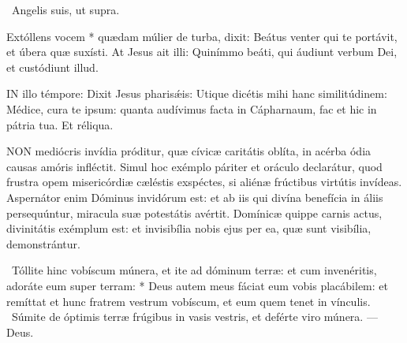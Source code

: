 \V\ Angelis suis, ut supra.

 Extóllens vocem * quædam múlier de turba, dixit: Beátus venter qui te portávit, et úbera quæ suxísti. At Jesus ait illi: Quinímmo beáti, qui áudiunt verbum Dei, et custódiunt illud.

\sectionornament





\lettrine[lines=2]{I}{N} illo témpore: Dixit Jesus pharisǽis: Utique dicétis mihi hanc similitúdinem: Médice, cura te ipsum: quanta audívimus facta in Cápharnaum, fac et hic in pátria tua. Et réliqua.



\lettrine[lines=2]{N}{ON} mediócris invídia próditur, quæ cívicæ caritátis oblíta, in acérba ódia causas amóris infléctit. Simul hoc exémplo páriter et oráculo declarátur, quod frustra opem misericórdiæ cæléstis exspéctes, si aliénæ frúctibus virtútis invídeas. Aspernátor enim Dóminus invidórum est: et ab iis qui divína benefícia in áliis persequúntur, miracula suæ potestátis avértit. Domínicæ quippe carnis actus, divinitátis exémplum est: et invisibília nobis ejus per ea, quæ sunt visibília, demonstrántur.

\R\ Tóllite hinc vobíscum múnera, et ite ad dóminum terræ: et cum invenéritis, adoráte eum super terram: * Deus autem meus fáciat eum vobis placábilem: et remíttat et hunc fratrem vestrum vobíscum, et eum quem tenet in vínculis. \V\ Súmite de óptimis terræ frúgibus in vasis vestris, et deférte viro múnera. --- Deus.


